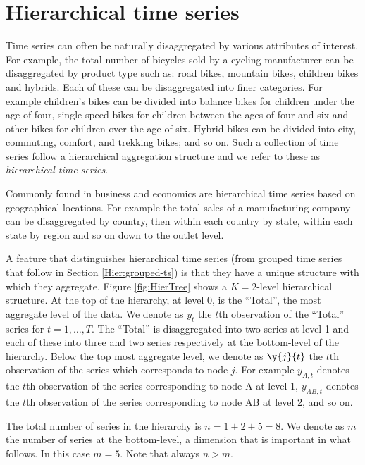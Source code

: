 \documentclass[]{book}
\begin{document}
\hypertarget{Hier:hierarchical-ts}{%
\section{Hierarchical time series}\label{Hier:hierarchical-ts}}

Time series can often be naturally disaggregated by various attributes of interest. For example, the total number of bicycles sold by a cycling manufacturer can be disaggregated by product type such as: road bikes, mountain bikes, children bikes and hybrids. Each of these can be disaggregated into finer categories. For example children's bikes can be divided into balance bikes for children under the age of four, single speed bikes for children between the ages of four and six and other bikes for children over the age of six. Hybrid bikes can be divided into city, commuting, comfort, and trekking bikes; and so on. Such a collection of time series follow a hierarchical aggregation structure and we refer to these as \emph{hierarchical time series}.

Commonly found in business and economics are hierarchical time series based on geographical locations. For example the total sales of a manufacturing company can be disaggregated by country, then within each country by state, within each state by region and so on down to the outlet level.

A feature that distinguishes hierarchical time series (from grouped time series that follow in Section \ref{Hier:grouped-ts}) is that they have a unique structure with which they aggregate. Figure \ref{fig:HierTree} shows a \(K=2\)-level hierarchical structure. At the top of the hierarchy, at level 0, is the ``Total'', the most aggregate level of the data. We denote as \(y_t\) the \(t\)th observation of the ``Total'' series for \(t=1,\dots,T\). The ``Total'' is disaggregated into two series at level 1 and each of these into three and two series respectively at the bottom-level of the hierarchy. Below the top most aggregate level, we denote as \(\y{j}{t}\) the \(t\)th observation of the series which corresponds to node \(j\). For example \(y_{A,t}\) denotes the \(t\)th observation of the series corresponding to node A at level 1, \(y_{AB,t}\) denotes the \(t\)th observation of the series corresponding to node AB at level 2, and so on.

The total number of series in the hierarchy is \(n=1+2+5=8\). We denote as \(m\) the number of series at the bottom-level, a dimension that is important in what follows. In this case \(m=5\). Note that always \(n>m\).
\end{document}
